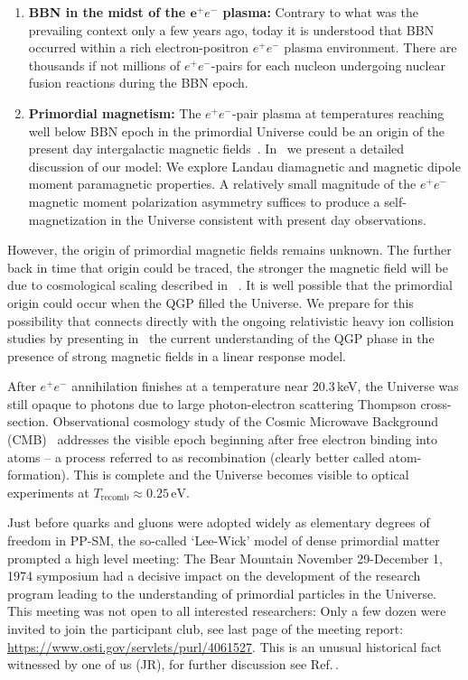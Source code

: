 \begin{enumerate}
%
\item \textbf{BBN in the midst of the ${\mathbf e^+e^-}$ plasma:} Contrary to what was the prevailing context only a few years ago, today it is understood that BBN occurred within a rich electron-positron $e^+e^-$ plasma environment. There are thousands if not millions of ${ e^+e^-}$-pairs for each nucleon undergoing nuclear fusion reactions during the BBN epoch. 
%
\item \textbf{Primordial magnetism:} The $e^{+}e^{-}$-pair plasma at temperatures reaching well below BBN epoch in the primordial Universe could be an origin of the present day intergalactic magnetic fields~\cite{Rafelski:2023emw,Steinmetz:2023nsc}. In~ we present a detailed discussion of our model: We explore Landau diamagnetic and magnetic dipole moment paramagnetic properties. A relatively small magnitude of the $e^{+}e^{-}$ magnetic moment polarization asymmetry suffices to produce a self-magnetization in the Universe consistent with present day observations. 
\end{enumerate}

{\color{black} However, the origin of primordial magnetic fields remains unknown. The further back in time that origin could be traced, the stronger the magnetic field will be due to cosmological scaling described in~ . It is well possible that the primordial origin could occur when the QGP filled the Universe. We prepare for this possibility that connects directly with the ongoing relativistic heavy ion collision studies by presenting in~ the current understanding of the QGP phase in the presence of strong magnetic fields in a linear response model.}

After $e^+e^-$ annihilation finishes at a temperature near 20.3\,keV, the Universe was still opaque to photons due to large photon-electron scattering Thompson cross-section. Observational cosmology study of the Cosmic Microwave Background (CMB)~\cite{Planck:2018vyg} addresses the visible epoch beginning after free electron binding into atoms -- a process referred to as recombination (clearly better called atom-formation). This is complete and the Universe becomes visible to optical experiments at $T_\mathrm{recomb}\approx 0.25\,\mathrm{eV}$. 

 Just before quarks and gluons were adopted widely as elementary degrees of freedom in PP-SM, the so-called `Lee-Wick' model of dense primordial matter prompted a high level meeting: The Bear Mountain November 29-December 1, 1974 symposium had a decisive impact on the development of the research program leading to the understanding of primordial particles in the Universe. This meeting was not open to all interested researchers: Only a few dozen were invited to join the participant club, see last page of the meeting report: \url{https://www.osti.gov/servlets/purl/4061527}. This is an unusual historical fact witnessed by one of us (JR), for further discussion see Ref.\,\cite{Rafelski:2019twp}.

